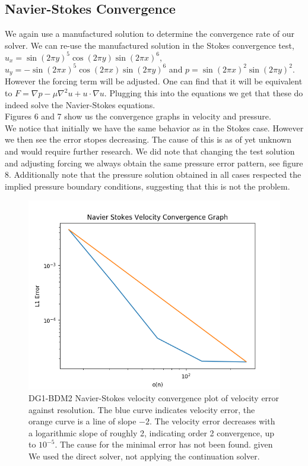 \documentclass[11pt,twoside,a4paper]{article}
\begin{document}
\subsection{Navier-Stokes Convergence}

We again use a manufactured solution to determine the convergence rate of our solver.
We can re-use the manufactured solution in the Stokes convergence test, $u_x = \sin(2 \pi y)^5 \cos(2 \pi y)\sin(2 \pi x)^6$, $u_y= -\sin(2 \pi x)^5 \cos(2 \pi x) \sin(2 \pi y)^6$ and $p = \sin(2 \pi x)^2 \sin(2 \pi y)^2$.\\
However the forcing term will be adjusted. One can find that it will be equivalent to $F = \nabla p - \mu \nabla^2 u + u \cdot \nabla u$.
Plugging this into the equations we get that these do indeed solve the Navier-Stokes equations.\\
Figures 6 and 7 show us the convergence graphs in velocity and pressure.\\
We notice that initially we have the same behavior as in the Stokes case. However we then see the error stopes decreasing. The cause of this is as of yet unknown and would require further research. We did note that changing the test solution and adjusting forcing we always obtain the same pressure error pattern, see figure 8. Additionally note that the pressure solution obtained in all cases respected the implied pressure boundary conditions, suggesting that this is not the problem.

\begin{figure}
  \includegraphics[width=\linewidth]{navier_stokes_convergence_dbc0.png}
  \caption{DG1-BDM2 Navier-Stokes velocity convergence plot of velocity error against resolution.  The blue curve indicates velocity error, the orange curve is a line of slope $-2$.  The velocity error decreases with a logarithmic slope of roughly 2, indicating order 2 convergence, up to $10^{-5}$. The cause for the minimal error has not been found. given We used the direct solver, not applying the continuation solver.}
\end{figure}
\end{document}
